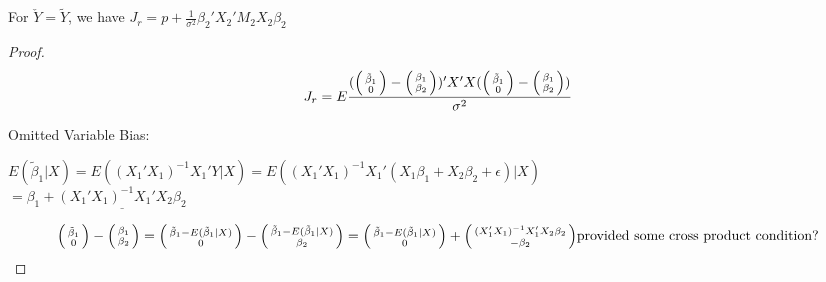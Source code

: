 \documentclass[DIV=14,titlepage=false]{scrreprt}
\begin{document}
\vspace{5mm}

\begin{lemma}
    For \(\check{Y}=\tilde{Y}\), we have \(J_r =p+\frac{1}{\sigma^2}\beta_2'X_2'M_2X_2\beta_2\)
\end{lemma}

\vspace{5mm}

\begin{proof}
    \[J_r = E\frac{(\begin{psmallmatrix}
        \tilde{\beta}_1 \\ 0 \end{psmallmatrix}-\begin{psmallmatrix} \beta_1 \\ \beta_2 \end{psmallmatrix})'X'X(\begin{psmallmatrix}
            \tilde{\beta}_1 \\ 0 \end{psmallmatrix}-\begin{psmallmatrix} \beta_1 \\ \beta_2 \end{psmallmatrix})}{\sigma^2}\]
    
    Omitted Variable Bias: \begin{center}
    \(E(\tilde{\beta}_1|X)=E((X_1'X_1)^{-1}X_1'Y|X)=E((X_1'X_1)^{-1}X_1'(X_1\beta_1+X_2\beta_2+\epsilon)|X)\)
     \\ \vspace{2mm} \(=\beta_1+\underline{(X_1'X_1)^{-1}X_1'X_2\beta_2}\)
    \end{center}
    \vspace{5mm}
\[ \begin{psmallmatrix}
    \tilde{\beta}_1 \\ 0 \end{psmallmatrix}-\begin{psmallmatrix} \beta_1 \\ \beta_2 \end{psmallmatrix}= \begin{psmallmatrix} \tilde{\beta}_1-E(\tilde{\beta}_1|X) \\0 \end{psmallmatrix} - \begin{psmallmatrix} \tilde{\beta}_1-E(\tilde{\beta}_1|X) \\ \beta_2 \end{psmallmatrix} = \begin{psmallmatrix} \tilde{\beta}_1-E(\tilde{\beta}_1|X) \\0 \end{psmallmatrix} + \begin{psmallmatrix} (X_1'X_1)^{-1}X_1'X_2\beta_2 \\ -\beta_2 \end{psmallmatrix} \text{provided some cross product condition?}\]


\end{proof}
\end{document}
